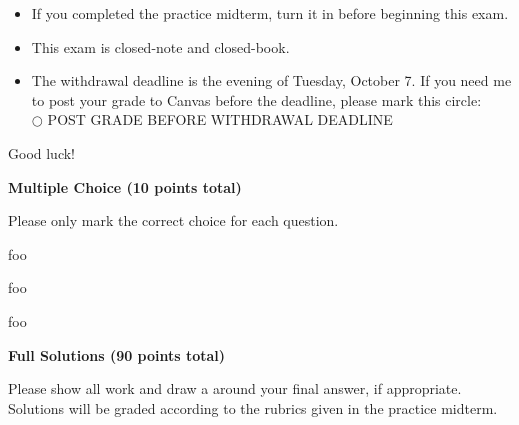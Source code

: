 \documentclass[12pt]{exam}
\begin{document}
\begin{center}
\end{center}
\vspace{0.1in}

\vspace{12pt}

\begin{itemize}
  \item If you completed the practice midterm, turn it in before beginning
        this exam.
  \item This exam is closed-note and closed-book.
  \item The withdrawal deadline is the evening of Tuesday, October 7.
        If you need me to post your grade to Canvas before the deadline,
        please mark this circle:\\
        $\bigcirc$ POST GRADE BEFORE WITHDRAWAL DEADLINE
\end{itemize}

\noindent
Good luck!

\newpage

\begin{center}
  \textbf{Multiple Choice (10 points total)}
\end{center}
\noindent
Please only mark the correct choice for each question.

\begin{questions}

\setcounter{question}{0}
\question[3]
foo

\vfill

\question[3]
foo

\vfill

\question[4]
foo

\vfill

\end{questions}

\newpage

\begin{center}
  \textbf{Full Solutions (90 points total)}
\end{center}
\noindent
Please show all work and draw a  around your final answer,
if appropriate. Solutions will be graded according to the rubrics given in
the practice midterm.
\end{document}
